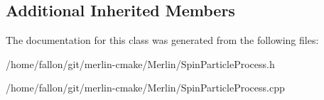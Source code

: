 \subsection*{Additional Inherited Members}


The documentation for this class was generated from the following files\+:\begin{DoxyCompactItemize}
\item 
/home/fallon/git/merlin-\/cmake/\+Merlin/Spin\+Particle\+Process.\+h\item 
/home/fallon/git/merlin-\/cmake/\+Merlin/Spin\+Particle\+Process.\+cpp\end{DoxyCompactItemize}
